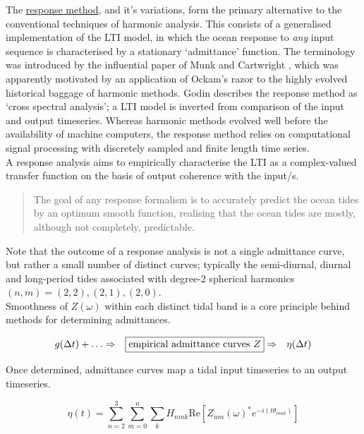 The \underline{response method}, and it's variations, form the primary alternative to the conventional techniques of harmonic analysis.   This consists of a generalised implementation of the LTI model, in which the ocean response to \emph{any} input sequence is characterised by a stationary `admittance' function.  The terminology was introduced by the influential paper of Munk and Cartwright \citep{Munk:1966ts}, which was apparently motivated by an application of Ockam's razor to the highly evolved historical baggage of harmonic methods.   Godin \citep{Godin:1991vx} describes the response method as `cross spectral analysis'; a LTI model is inverted from comparison of the input and output timeseries.   Whereas harmonic methods evolved well before the availability of machine computers, the response method relies on computational signal processing with discretely sampled and finite length time series. \\
A response analysis aims to empirically characterise the LTI as a complex-valued transfer function on the basis of output coherence with the input/s. 
\begin{quotation}
The goal of any response formalism is to accurately predict the ocean tides by an optimum smooth function, realising that the ocean tides are mostly, although not completely, predictable.
\end{quotation}

Note that the outcome of a response analysis is not a single admittance curve, but rather a small number of distinct curves; typically the semi-diurnal, diurnal and long-period tides associated with degree-2 spherical harmonics $(n,m)=(2,2),(2,1),(2,0)$.\\
Smoothness of $Z(\omega)$ within each distinct tidal band is a core principle behind methods for determining admittances.  

\begin{align}
\label{E:response}
g(\Delta t) + \dots &\Rightarrow & \fbox{empirical admittance curves $Z$} &\Rightarrow & \mbox{$\eta(\Delta t)$}  %
\end{align}

Once determined, admittance curves map a tidal input timeseries to an output timeseries.

\begin{equation}
\label{E:Z}
\eta(t) = \sum_{n=2}^{3}\sum_{m=0}^{n}\sum_{k} H_{nmk} \text{Re} \left[ Z_{nm}(\omega)^*e^{-i(t\theta_{nmk})} \right] 
\end{equation}


